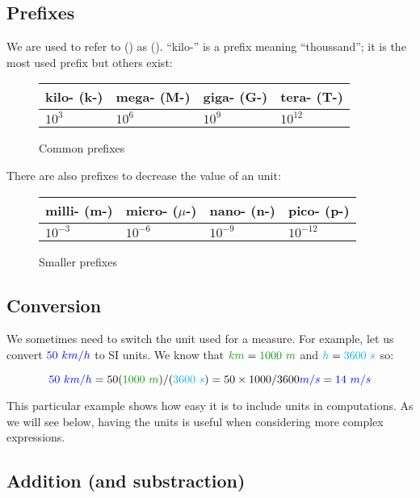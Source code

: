 \subsection{Prefixes}

We are used to refer to  () as  (). “kilo-” is a prefix meaning “thoussand”;
it is the most used prefix but others exist:

\begin{figure}[H]
	\centering
	\begin{tabular}{l|l|l|l}
		kilo- (k-) & mega- (M-) & giga- (G-) & tera- (T-) \\
		\hline
		$10^3$     & $10^6$     & $10^9$     & $10^{12}$  \\
	\end{tabular}
	\caption{Common prefixes}
\end{figure}

\begin{remark}
There are also prefixes to decrease the value of an unit:

\begin{figure}[H]
	\centering
	\begin{tabular}{l|l|l|l}
		milli- (m-) & micro- ($\mu$-) & nano- (n-) & pico- (p-) \\
		\hline
		$10^{-3}$   & $10^{-6}$       & $10^{-9}$  & $10^{-12}$ \\
	\end{tabular}
	\caption{Smaller prefixes}
\end{figure}
\end{remark}


\subsection{Conversion}

We sometimes need to switch the unit used for a measure. For example,
let us convert $\textcolor{blue}{50~km/h}$ to SI units. We know that $\dist{km}
= \dist{1000~m}$ and $\textcolor{cyan}{h} = \textcolor{cyan}{3600~s}$ so:

\[
\speed{50~km/h}
= 50 (\dist{1000~m})/(\delay{3600~s})
= 50 \times 1000 / 3600 \speed{m/s}
= \speed{14~m/s}
\]

This particular example shows how easy it is to include units in
computations. As we will see below, having the units is useful when
considering more complex expressions.


\subsection{Addition (and substraction)}

